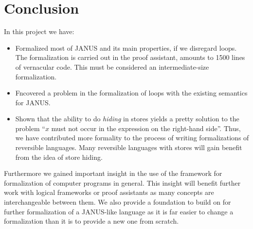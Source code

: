 \chapter{Conclusion}

In this project we have:
\begin{itemize}
\item Formalized most of JANUS and its main properties, if we
  disregard loops. The formalization is carried out in the \coq{}
  proof assistant, amounts to 1500 lines of vernacular code. This must
  be considered an intermediate-size formalization.
\item Fncovered a problem in the formalization of loops with
  the existing semantics for JANUS.
\item Shown that the ability to do \emph{hiding} in stores
  yields a pretty solution to the problem ``$x$ must not occur in the
  expression on the right-hand side''. Thus, we have contributed more
  formality to the process of writing formalizations of reversible
  languages. Many reversible languages with stores will gain benefit
  from the idea of store hiding.
\end{itemize}

Furthermore we gained important insight in the use of the \coq{}
framework for formalization of computer programs in general. This
insight will benefit further work with logical frameworks or proof
assistants as many concepts are interchangeable between them. We also
provide a foundation to build on for further formalization of a
JANUS-like language as it is far easier to change a formalization than
it is to provide a new one from scratch.

